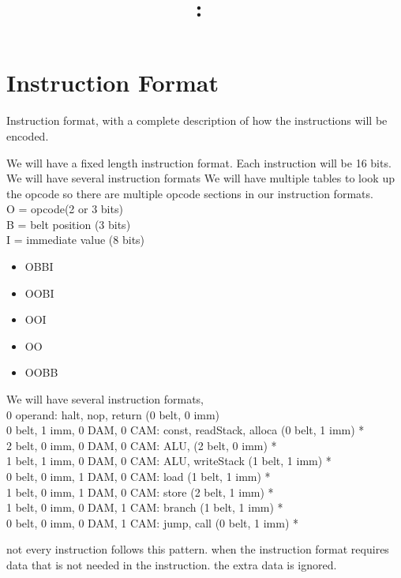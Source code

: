 \documentclass{article}
\title{
	\vspace{2in}
	\textmd{\textbf{\hmwkClass:\ \hmwkTitle}}\\
	\vspace{3in}
}
\author{\hmwkAuthorName}
\date{}
\begin{document}
\maketitle

\pagebreak

\section{Instruction Format}
	Instruction format, with a complete description of how the instructions will be encoded.

	We will have a fixed length instruction format. Each instruction will be 16 bits.
	We will have several instruction formats
	We will have multiple tables to look up the opcode so there are multiple opcode sections in our instruction formats.\\
	O = opcode(2 or 3 bits)\\
	B = belt position (3 bits)\\
	I = immediate value (8 bits)\\
	\begin{itemize}
		\item OBBI
		\item OOBI
		\item OOI
		\item OO
		\item OOBB
	\end{itemize}



	We will have several instruction formats,\\
	0 operand: halt, nop, return                            (0 belt, 0 imm)\\
	0 belt, 1 imm, 0 DAM, 0 CAM: const, readStack, alloca   (0 belt, 1 imm) *\\
	2 belt, 0 imm, 0 DAM, 0 CAM: ALU,                       (2 belt, 0 imm) *\\
	1 belt, 1 imm, 0 DAM, 0 CAM: ALU, writeStack            (1 belt, 1 imm) *\\
	0 belt, 0 imm, 1 DAM, 0 CAM: load                       (1 belt, 1 imm) *\\
	1 belt, 0 imm, 1 DAM, 0 CAM: store                      (2 belt, 1 imm) * \\
	1 belt, 0 imm, 0 DAM, 1 CAM: branch                     (1 belt, 1 imm) * \\
	0 belt, 0 imm, 0 DAM, 1 CAM: jump, call                 (0 belt, 1 imm) * 

	not every instruction follows this pattern. when the instruction format requires data that is not needed in the instruction. the extra data is ignored.
\end{document}
